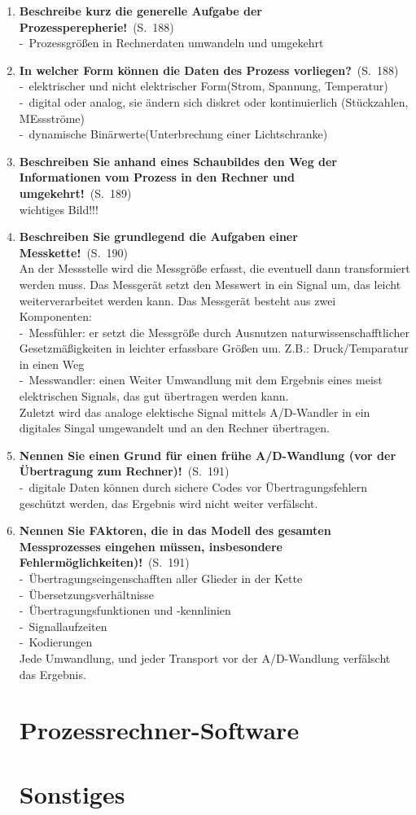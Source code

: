 \documentclass[a4paper,12pt]{article}
\newcommand{\question}[3]{\pagebreak[3]\item {\textbf{#1?}}\ (S.\ #2)#3}
\newcommand{\statement}[3]{\pagebreak[3]\item {\textbf{#1!}}\ (S.\ #2)#3}
\newcommand{\catchword}[1]{\\-\ #1}
\newcommand{\normaltext}[1]{\\#1}
\newcommand{\page}[1]{#1}
\begin{document}
\begin{enumerate}
  \statement{Beschreibe kurz die generelle Aufgabe der Prozessperepherie}{\page{188}}
  {
    \catchword{Prozessgrößen in Rechnerdaten umwandeln und umgekehrt}
  }
  
  \question{In welcher Form können die Daten des Prozess vorliegen}{\page{188}}
  {
    \catchword{elektrischer und nicht elektrischer Form(Strom, Spannung, Temperatur)}
    \catchword{digital oder analog, sie ändern sich diskret oder kontinuierlich (Stückzahlen, MEssströme)}
    \catchword{dynamische Binärwerte(Unterbrechung einer Lichtschranke)}
  }
  
  \statement{Beschreiben Sie anhand eines Schaubildes den Weg der Informationen vom Prozess in den Rechner und umgekehrt}{\page{189}}
 {
  \normaltext{wichtiges Bild!!!}
 } 
 
 \statement{Beschreiben Sie grundlegend die Aufgaben einer Messkette}{\page{190}}
 {
  \normaltext{An der Messstelle wird die Messgröße erfasst, die eventuell dann transformiert werden muss.
  Das Messgerät setzt den Messwert in ein Signal um, das leicht weiterverarbeitet werden kann. Das Messgerät besteht aus zwei Komponenten:}
 \catchword{Messfühler: er setzt die Messgröße durch Ausnutzen naturwissenschafftlicher Gesetzmäßigkeiten in leichter erfassbare Größen um. Z.B.: Druck/Temparatur in einen Weg} 
 \catchword{Messwandler: einen Weiter Umwandlung mit dem Ergebnis eines meist elektrischen Signals, das gut übertragen werden kann.}
 \normaltext{Zuletzt wird das analoge elektische Signal mittels A/D-Wandler in ein digitales Singal umgewandelt und an den Rechner übertragen.}
 
 
 }
 
 \statement{Nennen Sie einen Grund für einen frühe A/D-Wandlung (vor der Übertragung zum Rechner)}{\page{191}} 
 {
 \catchword{digitale Daten können durch sichere Codes vor Übertragungsfehlern geschützt werden, das Ergebnis wird nicht weiter verfälscht.} 
 }
 
  \statement{Nennen Sie FAktoren, die in das Modell des gesamten Messprozesses eingehen müssen, insbesondere Fehlermöglichkeiten)}{\page{191}} 
 {
 \catchword{Übertragungseingenschafften aller Glieder in der Kette} 
 \catchword{Übersetzungsverhältnisse} 
 \catchword{Übertragungsfunktionen und -kennlinien} 
 \catchword{Signallaufzeiten} 
 \catchword{Kodierungen}
 \normaltext{Jede Umwandlung, und jeder Transport vor der A/D-Wandlung verfälscht das Ergebnis.}
 }

 
 
 
  
  
  
  
  
  
  
  


  \newpage
  \section{Prozessrechner-Software}


  \newpage
  \section{Sonstiges}


\end{enumerate}
\end{document}
